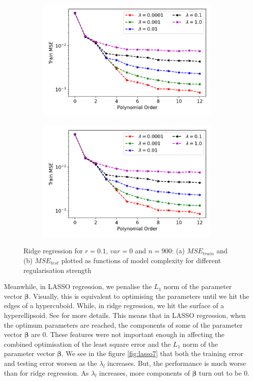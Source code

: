 \begin{figure}
\centering
\begin{subfigure}{.5\textwidth}
  \centering
  \includegraphics[width=.9\linewidth]{Images/ridge7b.png}
  \caption{}
  \label{fig:ridge7}
\end{subfigure}%
\begin{subfigure}{.5\textwidth}
  \centering
  \includegraphics[width=.9\linewidth]{Images/ridge7b.png}
  \caption{}
  \label{fig:ridge7b}
\end{subfigure}
\caption{Ridge regression for $r=0.1$, $var=0$ and $n=900$: (a) $MSE_{train}$ and (b) $MSE_{test}$ plotted as functions of model complexity for different regularisation strength}
\label{fig:Ridge1}
\end{figure}

Meanwhile, in LASSO regression, we penalise the $L_1$ norm of the parameter vector $\boldsymbol \beta$. Visually, this is equivalent to optimising the parameters until we hit the edges of a hypercuboid. While, in ridge regression, we hit the surface of a hyperellipsoid. See \cite{mehta_high-bias_2019} for more details. This means that in LASSO regression, when the optimum parameters are reached, the components of some of the parameter vector $\boldsymbol \beta$ are 0. These features were not important enough in affecting the combined optimisation of the least square error and the $L_1$ norm of the parameter vector $\boldsymbol \beta$. We see in the figure \ref{fig:lasso7} that both the training error and testing error  worsen as the $\lambda_l$ increases. But, the performance is much worse than for ridge regression. As $\lambda_l$ increases, more components of $\boldsymbol \beta$ turn out to be 0. 


